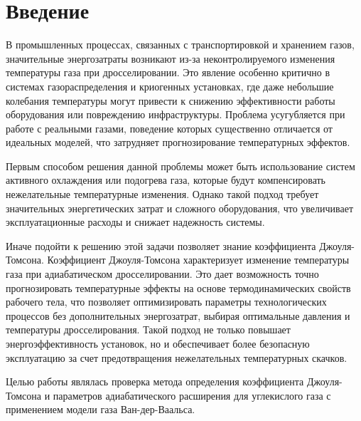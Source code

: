 \chapter{Введение}
\label{ch:intro}

В промышленных процессах, связанных с транспортировкой и хранением газов, значительные энергозатраты возникают из-за неконтролируемого изменения температуры газа при дросселировании. Это явление особенно критично в системах газораспределения и криогенных установках, где даже небольшие колебания температуры могут привести к снижению эффективности работы оборудования или повреждению инфраструктуры. Проблема усугубляется при работе с реальными газами, поведение которых существенно отличается от идеальных моделей, что затрудняет прогнозирование температурных эффектов.

Первым способом решения данной проблемы может быть использование систем активного охлаждения или подогрева газа, которые будут компенсировать нежелательные температурные изменения. Однако такой подход требует значительных энергетических затрат и сложного оборудования, что увеличивает эксплуатационные расходы и снижает надежность системы.

Иначе подойти к решению этой задачи позволяет знание коэффициента Джоуля-Томсона. Коэффициент Джоуля-Томсона характеризует изменение температуры газа при адиабатическом дросселировании. Это дает возможность точно прогнозировать температурные эффекты на основе термодинамических свойств рабочего тела, что позволяет оптимизировать параметры технологических процессов без дополнительных энергозатрат, выбирая оптимальные давления и температуры дросселирования. Такой подход не только повышает энергоэффективность установок, но и обеспечивает более безопасную эксплуатацию за счет предотвращения нежелательных температурных скачков.

Целью работы являлась проверка метода определения коэффициента Джоуля-Томсона и параметров адиабатического расширения для углекислого газа с применением модели газа Ван-дер-Ваальса.